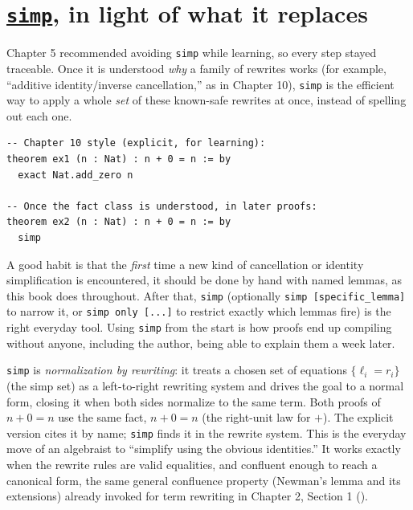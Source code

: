 \section{\texorpdfstring{\href{https://lean-lang.org/doc/reference/latest/Tactic-Proofs/Tactic-Reference/}{\texttt{simp}}, in light of what it replaces}{simp, in light of what it replaces}}\label{sec:13-working-efficiently:03-simp:1}

Chapter 5 recommended avoiding \texttt{simp} while learning, so every step stayed traceable. Once it is understood \emph{why} a family of rewrites works (for example, ``additive identity/inverse cancellation,'' as in Chapter 10), \texttt{simp} is the efficient way to apply a whole \emph{set} of these known-safe rewrites at once, instead of spelling out each one.

\begin{lstlisting}
-- Chapter 10 style (explicit, for learning):
theorem ex1 (n : Nat) : n + 0 = n := by
  exact Nat.add_zero n

-- Once the fact class is understood, in later proofs:
theorem ex2 (n : Nat) : n + 0 = n := by
  simp
\end{lstlisting}

A good habit is that the \emph{first} time a new kind of cancellation or identity simplification is encountered, it should be done by hand with named lemmas, as this book does throughout. After that, \texttt{simp} (optionally \texttt{simp [specific\_\allowbreak{}lemma]} to narrow it, or \texttt{simp only [...]} to restrict exactly which lemmas fire) is the right everyday tool. Using \texttt{simp} from the start is how proofs end up compiling without anyone, including the author, being able to explain them a week later.

\begin{mathreading}

\texttt{simp} is \emph{normalization by rewriting}: it treats a chosen set of equations \(\{\ell_i = r_i\}\) (the simp set) as a left-to-right rewriting system and drives the goal to a normal form, closing it when both sides normalize to the same term. Both proofs of \(n + 0 = n\) use the same fact, \(n + 0 = n\) (the right-unit law for \(+\)). The explicit version cites it by name; \texttt{simp} finds it in the rewrite system. This is the everyday move of an algebraist to ``simplify using the obvious identities.'' It works exactly when the rewrite rules are valid equalities, and confluent enough to reach a canonical form, the same general confluence property (Newman's lemma and its extensions) already invoked for term rewriting in Chapter 2, Section 1 (\cite{Huet1980}).

\end{mathreading}
